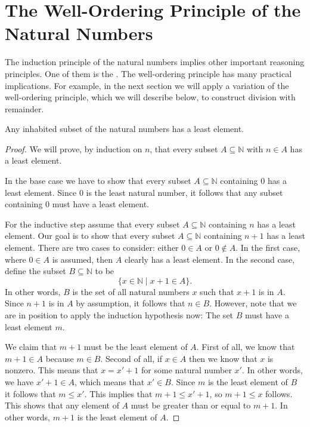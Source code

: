 \section{The Well-Ordering Principle of the Natural Numbers}

The induction principle of the natural numbers implies other important reasoning principles. One of them is the . The well-ordering principle has many practical implications. For example, in the next section we will apply a variation of the well-ordering principle, which we will describe below, to construct division with remainder.

\begin{theorem}\label{theorem:well-ordering-natural-numbers}
  Any inhabited subset of the natural numbers has a least element.
\end{theorem}

\begin{proof}
  We will prove, by induction on $n$, that every subset $A\subseteq \mathbb{N}$ with $n\in A$ has a least element.

  In the base case we have to show that every subset $A\subseteq \mathbb{N}$ containing $0$ has a least element. Since $0$ is the least natural number, it follows that any subset containing $0$ must have a least element.

  For the inductive step assume that every subset $A\subseteq \mathbb{N}$ containing $n$ has a least element. Our goal is to show that every subset $A\subseteq \mathbb{N}$ containing $n+1$ has a least element. There are two cases to consider: either $0\in A$ or $0\notin A$. In the first case, where $0\in A$ is assumed, then $A$ clearly has a least element. In the second case, define the subset $B\subseteq\mathbb{N}$ to be
  \begin{equation*}
    \{x\in\mathbb{N} \mid x+1\in A\}.
  \end{equation*}
  In other words, $B$ is the set of all natural numbers $x$ such that $x+1$ is in $A$. Since $n+1$ is in $A$ by assumption, it follows that $n\in B$. However, note that we are in position to apply the induction hypothesis now: The set $B$ must have a least element $m$.

  We claim that $m+1$ must be the least element of $A$. First of all, we know that $m+1\in A$ because $m\in B$. Second of all, if $x\in A$ then we know that $x$ is nonzero. This means that $x=x'+1$ for some natural number $x'$. In other words, we have $x'+1\in A$, which means that $x'\in B$. Since $m$ is the least element of $B$ it follows that $m\leq x'$. This implies that $m+1\leq x'+1$, so $m+1\leq x$ follows. This shows that any element of $A$ must be greater than or equal to $m+1$. In other words, $m+1$ is the least element of $A$.
\end{proof}

